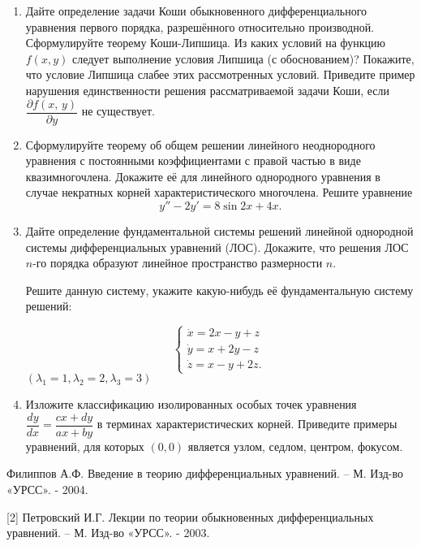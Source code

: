 %
%

\begin{enumerate}
\item Дайте определение задачи Коши обыкновенного дифференциального уравнения первого порядка, разрешённого относительно производной. Сформулируйте теорему Коши-Липшица. Из каких условий на функцию $f(x, y)$ следует выполнение условия Липшица (с обоснованием)?  Покажите, что условие Липшица слабее этих рассмотренных условий. Приведите пример нарушения единственности решения рассматриваемой задачи Коши, если $\dfrac{\partial f(x,\,y)}{\partial y}$ не существует. 

\item Сформулируйте теорему об общем решении линейного неоднородного уравнения с постоянными коэффициентами с правой частью в виде квазимногочлена. Докажите её для линейного однородного уравнения в случае некратных корней характеристического многочлена.
Решите уравнение
 $$y''-2y'=8 \sin 2 x+4x.$$

\item Дайте определение фундаментальной системы решений линейной однородной системы дифференциальных уравнений (ЛОС). Докажите, что решения ЛОС $n$-го порядка образуют линейное пространство размерности $n$. 

Решите данную систему, укажите какую-нибудь её фундаментальную систему решений:


\begin{equation*}
 \begin{cases}
   \dot{x}=2 x-y+z\\
\dot{y}=x+2y-z\\
\dot{z}=x-y+2z.
  \
 \end{cases}  
\end{equation*}
$(\lambda_{1}=1, \lambda_2=2, \lambda_3=3)$

\item Изложите классификацию изолированных особых точек уравнения $\dfrac{dy}{dx}=\dfrac{cx+dy}{ax+by}$ в терминах характеристических корней. Приведите примеры уравнений, для которых $(0, 0)$ является узлом, седлом, центром, фокусом.

\end{enumerate}

\bigskip
[1] Филиппов А.Ф. Введение в теорию дифференциальных уравнений. – М. Изд-во «УРСС». - 2004.

[2] Петровский И.Г. Лекции по теории обыкновенных дифференциальных уравнений. – М. Изд-во «УРСС». - 2003.


